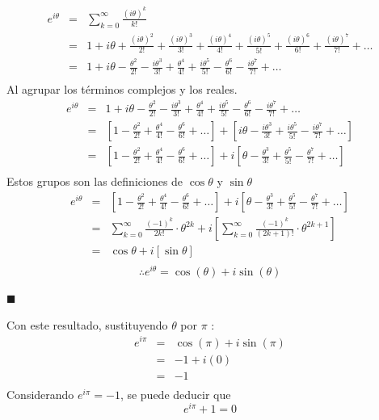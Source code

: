 \documentclass[12pt]{article}
\begin{document}
\begin{eqnarray}
e^{i\theta} 
& = &   \sum_{k=0}^{\infty}\frac{(i\theta)^{k}}{k!} \nonumber
\\
& = & 1 + i\theta + \frac{(i\theta)^2}{2!} + \frac{(i\theta)^3}{3!}+ \frac{(i\theta)^4}{4!}+ \frac{(i\theta)^5}{5!} + \frac{(i\theta)^6}{6!} + \frac{(i\theta)^7}{7!}+ \ldots  \nonumber
\\
& = &  1 + i\theta - \frac{\theta^2}{2!} - \frac{i\theta^3}{3!}+ \frac{\theta^4}{4!}+ \frac{i\theta^5}{5!} - \frac{\theta^6}{6!} - \frac{i\theta^7}{7!}+ \ldots  \nonumber
\\\nonumber
\end{eqnarray}
Al agrupar los términos complejos y los reales.
\begin{eqnarray}
e^{i\theta} 
& = &  1 + i\theta - \frac{\theta^2}{2!} - \frac{i\theta^3}{3!}+ \frac{\theta^4}{4!}+ \frac{i\theta^5}{5!} - \frac{\theta^6}{6!} - \frac{i\theta^7}{7!}+ \ldots  \nonumber
\\
& = &  [1 - \frac{\theta^2}{2!} + \frac{\theta^4}{4!}- \frac{\theta^6}{6!} + \ldots ]+[i\theta   - \frac{i\theta^3}{3!}+ \frac{i\theta^5}{5!} - \frac{i\theta^7}{7!}+ \ldots]  \nonumber
\\
& = &  [1 - \frac{\theta^2}{2!} + \frac{\theta^4}{4!}- \frac{\theta^6}{6!} + \ldots ]+i[\theta   - \frac{\theta^3}{3!}+ \frac{\theta^5}{5!} - \frac{\theta^7}{7!}+ \ldots]  \nonumber
\\\nonumber
\end{eqnarray}
Estos grupos son las definiciones de $\cos\theta$ y $\sin\theta$
\begin{eqnarray}
e^{i\theta} \nonumber
& = &  [1 - \frac{\theta^2}{2!} + \frac{\theta^4}{4!}- \frac{\theta^6}{6!} + \ldots ]+i[\theta   - \frac{\theta^3}{3!}+ \frac{\theta^5}{5!} - \frac{\theta^7}{7!}+ \ldots]  \nonumber
\\
& = & \sum_{k=0}^{\infty}\frac{(-1)^{k}}{2k!} \cdot \theta ^{2k} +i [\sum_{k=0}^{\infty}\frac{(-1)^{k}}{(2k+1)!} \cdot \theta ^{2k+1}] \nonumber
\\
& = & \cos\theta +i [\sin\theta] \nonumber
\\ \nonumber
\end{eqnarray}
\[
\therefore e^{i\theta} = \cos(\theta) + i \sin(\theta)
\]
\begin{flushright}
$\blacksquare$
\end{flushright}
Con este resultado, sustituyendo $\theta$ por $\pi$ :
\begin{eqnarray}
e^{i\pi} \nonumber
& = &  \cos(\pi) + i \sin(\pi) \nonumber
\\
& = &  -1 + i (0) \nonumber
\\
& = &  -1\nonumber
\\ \nonumber
\end{eqnarray}
Considerando $e^{i\pi} = -1$, se puede deducir que 
\[
e^{i\pi} +1 = 0
\]
\end{document}
